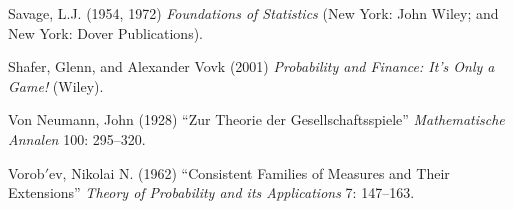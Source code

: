 \documentclass[11pt]{article}
\begin{document}
\begin{description}
\item Savage, L.J. (1954, 1972) \textit{Foundations of Statistics}
	(New York: John Wiley; and New York: Dover Publications).
	
\item Shafer, Glenn, and Alexander Vovk (2001) 
	\textit{Probability and Finance: It's Only a Game!} (Wiley).

\item Von Neumann, John (1928) ``Zur Theorie der Gesellschaftsspiele'' 
	\textit{Mathematische Annalen} 100: 295--320.
	
\item Vorob$'$ev, Nikolai N. (1962) 
	``Consistent Families of Measures and Their Extensions''
	\textit{Theory of Probability and its Applications} 7: 147--163.

\end{description}
\end{document}

